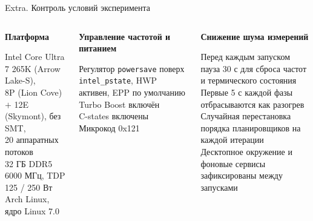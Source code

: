 \documentclass[aspectratio=169,11pt]{beamer}
\begin{document}
\begin{frame}{Extra. Контроль условий эксперимента}
        \footnotesize
        \begin{columns}[T]
                \begin{shadowbox}
                        \textbf{Платформа}

                        \scriptsize
                        Intel Core Ultra 7 265K (Arrow Lake-S),\\
                        8P (Lion Cove) $+$ 12E (Skymont), без SMT,\\
                        20 аппаратных потоков\\[0.15em]
                        32 ГБ DDR5 6000 МГц, TDP 125 / 250 Вт\\[0.15em]
                        Arch Linux, ядро Linux 7.0
                \end{shadowbox}

                \begin{shadowbox}
                        \textbf{Управление частотой и питанием}

                        \scriptsize
                        Регулятор \texttt{powersave} поверх
                        \texttt{intel\_pstate}, HWP активен, EPP
                        по умолчанию\\[0.15em]
                        Turbo Boost включён\\[0.15em]
                        C-states включены\\[0.15em]
                        Микрокод 0x121
                \end{shadowbox}

                \begin{shadowbox2}
                        \textbf{Снижение шума измерений}

                        \scriptsize
                        Перед каждым запуском пауза 30 с для сброса
                        частот и термического состояния\\[0.15em]
                        Первые 5 с каждой фазы отбрасываются как
                        разогрев\\[0.15em]
                        Случайная перестановка порядка планировщиков
                        на каждой итерации\\[0.15em]
                        Десктопное окружение и фоновые сервисы
                        зафиксированы между запусками
                \end{shadowbox2}


\end{columns}
\end{frame}
\end{document}
